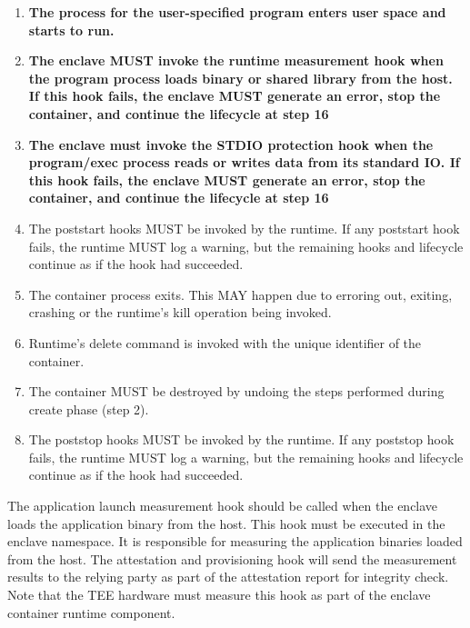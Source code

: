 \begin{enumerate}
    \item \textbf{The process for the user-specified program enters user space and starts to run.}
    \item \textbf{The enclave MUST invoke the runtime measurement hook when the program process loads binary or shared library from the host. If this hook fails, the enclave MUST generate an error, stop the container, and continue the lifecycle at step 16}
    \item \textbf{The enclave must invoke the STDIO protection hook when the program/exec process reads or writes data from its standard IO. If this hook fails, the enclave MUST generate an error, stop the container, and continue the lifecycle at step 16}
    \item The poststart hooks MUST be invoked by the runtime. If any poststart hook fails, the runtime MUST log a warning, but the remaining hooks and lifecycle continue as if the hook had succeeded.
    \item The container process exits. This MAY happen due to erroring out, exiting, crashing or the runtime's kill operation being invoked.
    \item Runtime's delete command is invoked with the unique identifier of the container.
    \item The container MUST be destroyed by undoing the steps performed during create phase (step 2).
    \item The poststop hooks MUST be invoked by the runtime. If any poststop hook fails, the runtime MUST log a warning, but the remaining hooks and lifecycle continue as if the hook had succeeded.    
  \end{enumerate}


  The application launch measurement hook should be called when the enclave loads the application binary from the host. This hook must be executed in the enclave namespace. It is responsible for measuring the application binaries loaded from the 
  host. The attestation and provisioning hook will send the measurement results to the relying party as part of the attestation report for integrity check. Note that the TEE hardware must measure this hook as part of the enclave container runtime 
  component.
  

